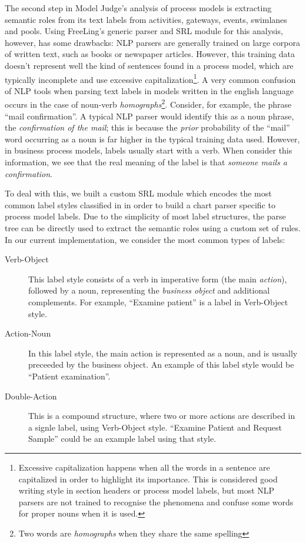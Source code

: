 The second step in Model Judge's analysis of process models is extracting
semantic roles from its text labels from activities, gateways, events, swimlanes
and pools. Using FreeLing's generic parser and SRL module for this analysis,
however, has some drawbacks: NLP parsers are generally trained on large corpora
of written text, such as books or newspaper articles. However, this training
data doesn't represent well the kind of sentences found in a process model,
which are typically incomplete and use excessive
capitalization\footnote{Excessive capitalization happens when all the words in a
sentence are capitalized in order to highlight its importance. This is
considered good writing style in section headers or process model labels, but
most NLP parsers are not trained to recognise the phenomena and confuse some
words for proper nouns when it is used.}. A very common confusion of NLP tools 
when parsing text labels in models written in the english language occurs in the
case of noun-verb \emph{homographs}\footnote{Two words are \emph{homographs}
  when they share the same spelling}. Consider, for example, the phrase ``mail
confirmation''. A typical NLP parser would identify this as a noun phrase, the
\emph{confirmation of the mail}; this is because the \emph{prior} probability of
the ``mail'' word occurring as a noun is far higher in the typical training data
used. However, in business process models, labels usually start with a verb.
When consider this information, we see that the real meaning of the label is
that \emph{someone mails a confirmation}.

To deal with this, we built a custom SRL module which encodes the most common
label styles classified in \cite{leopold2013detection} in order to
build a chart parser specific to process model labels. Due to the simplicity of
most label structures, the parse tree can be directly used to extract the
semantic roles using a custom set of rules. In our current implementation, we
consider the most common types of labels:

\begin{description}
  \item[Verb-Object]{This label style consists of a verb in imperative form (the
      main \emph{action}), followed by a noun, representing the \emph{business
        object} and additional complements. For example, ``Examine patient'' is
      a label in Verb-Object style.}
  \item[Action-Noun]{In this label style, the main action is represented as a
      noun, and is usually preceeded by the business object. An example of this
      label style would be ``Patient examination''.}
  \item[Double-Action]{This is a compound structure, where two or more actions
    are described in a signle label, using Verb-Object style. ``Examine Patient
    and Request Sample'' could be an example label using that style.}
\end{description}

